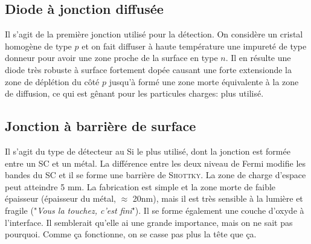 \subsection{Diode à jonction diffusée}
Il s'agit de la première jonction utilisé pour la détection. On considère un cristal homogène de
type $p$ et on fait diffuser à haute température une impureté de type donneur pour avoir une zone 
proche de la surface en type $n$. Il en résulte une diode très robuste à surface fortement dopée
causant une forte extensionde la zone de déplétion du côté $p$ jusqu'à formé une zone morte 
équivalente à la zone de diffusion, ce qui est gênant pour les particules charges: plus utilisé.



\subsection{Jonction à barrière de surface}
Il s'agit du type de détecteur au Si le plus utilisé, dont la jonction est formée entre un SC 
et un métal. La différence entre les deux niveau de 
Fermi modifie les bandes du SC et il se forme une barrière de \textsc{Shottky}. La zone de
charge d'espace peut atteindre 5 mm. La fabrication est simple et la zone morte de faible
épaisseur (épaisseur du métal, $\approx$ 20nm), mais il est très sensible à la lumière et fragile
("\textit{Vous la touchez, c'est fini}"). Il se forme également une couche d'oxyde à l'interface. Il
semblerait qu'elle ai une grande importance, mais on ne sait pas pourquoi. Comme ça fonctionne, on se
casse pas plus la tête que ça.\\


